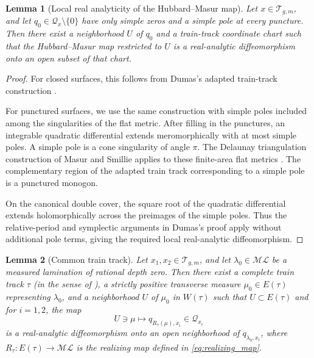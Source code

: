\documentclass[dvipdfmx]{amsart}
\newtheorem{lemma}{Lemma}[section]
\theoremstyle{remark}
\newcommand{\teich}{\mathcal{T}}
\newcommand{\ml}{\mathcal{ML}}
\begin{document}
\begin{lemma}[Local real analyticity of the
Hubbard--Masur map]
\label{lem:HM_local_analytic}
Let $x\in\teich_{g,m}$, and let $q_0\in\mathcal Q_x\setminus \{0\}$
have only simple zeros and a simple pole at every
puncture.
Then there exist a neighborhood $U$ of $q_0$ and a
train-track coordinate chart such that the
Hubbard--Masur map restricted to $U$ is a
real-analytic diffeomorphism onto an open subset
of that chart.
\end{lemma}

\begin{proof}
For closed surfaces, this follows from Dumas's
adapted train-track construction
\cite[Lemma 5.7 and Theorem 5.8]{Dumas2015}.

For punctured surfaces, we use the same construction
with simple poles included among the singularities
of the flat metric.
After filling in the punctures, an integrable
quadratic differential extends meromorphically
with at most simple poles.
A simple pole is a cone singularity of angle $\pi$.
The Delaunay triangulation construction of
Masur and Smillie applies to these finite-area
flat metrics
\cite[\S4]{MasurSmillie1991}.
The complementary region of the adapted train track
corresponding to a simple pole is a punctured monogon.

On the canonical double cover, the square root of
the quadratic differential extends holomorphically
across the preimages of the simple poles.
Thus the relative-period and symplectic arguments
in Dumas's proof apply without additional pole terms,
giving the required local real-analytic
diffeomorphism.
\end{proof}

\begin{lemma}[Common train track]
\label{lem:common_splitting}
Let $x_1,x_2\in\teich_{g,m}$, and let $\lambda_0\in\ml$ be a measured lamination of rational depth zero. Then there exist a complete train track $\tau$
(in the sense of \cite{PennerHarer1992}), a strictly positive transverse measure $\mu_0\in E(\tau)$ representing $\lambda_0$, and a neighborhood $U$ of $\mu_0$ in $W(\tau)$ such that $U\subset E(\tau)$ and for $i=1,2$, the map
\[
U\ni\mu\longmapsto q_{R_\tau(\mu),x_i}\in\mathcal Q_{x_i}
\]
is a real-analytic diffeomorphism onto an open neighborhood of $q_{\lambda_0,x_i}$, where $R_\tau\colon E(\tau)\to\ml$ is the realizing map defined in \eqref{eq:realizing_map}.
\end{lemma}
\end{document}
